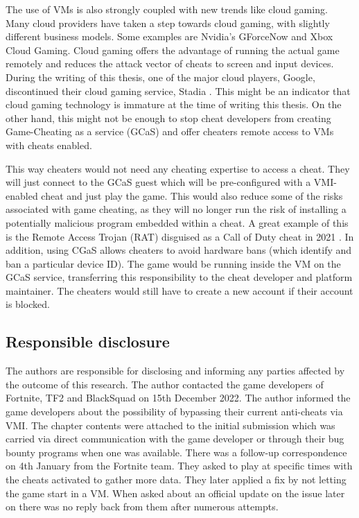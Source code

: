 The use of VMs is also strongly coupled with new trends like cloud gaming. Many cloud providers have taken a step towards cloud gaming, with slightly different business models. Some examples are Nvidia's GForceNow and Xbox Cloud Gaming. Cloud gaming offers the advantage of running the actual game remotely and reduces the attack vector of cheats to screen and input devices. During the writing of this thesis, one of the major cloud players, Google, discontinued their cloud gaming service, Stadia \cite{stadiaClosure}. This might be an indicator that cloud gaming technology is immature at the time of writing this thesis. On the other hand, this might not be enough to stop cheat developers from creating Game-Cheating as a service (GCaS) and offer cheaters remote access to VMs with cheats enabled. 

This way cheaters would not need any cheating expertise to access a cheat. They will just connect to the GCaS guest which will be pre-configured with a VMI-enabled cheat and just play the game. This would also reduce some of the risks associated with game cheating, as they will no longer run the risk of installing a potentially malicious program embedded within a cheat. A great example of this is the Remote Access Trojan (RAT) disguised as a Call of Duty cheat in 2021 \cite{callOfDutyTrojan}. In addition, using CGaS allows cheaters to avoid hardware bans (which identify and ban a particular device ID). The game would be running inside the VM on the GCaS service, transferring this responsibility to the cheat developer and platform maintainer. The cheaters would still have to create a new account if their account is blocked. 


\subsection{Responsible disclosure}
\label{subsec:ResponsibleDisclosure}
The authors are responsible for disclosing and informing any parties affected by the outcome of this research. The author contacted the game developers of Fortnite, TF2 and BlackSquad on 15th December 2022. The author informed the game developers about the possibility of bypassing their current anti-cheats via VMI. The chapter contents were attached to the initial submission which was carried via direct communication with the game developer or through their bug bounty programs when one was available. There was a follow-up correspondence on 4th January from the Fortnite team. They asked to play at specific times with the cheats activated to gather more data. They later applied a fix by not letting the game start in a VM. When asked about an official update on the issue later on there was no reply back from them after numerous attempts. 

